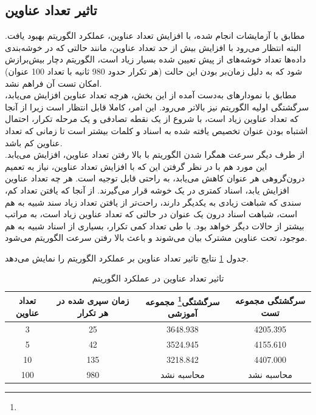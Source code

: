 \documentclass[11.5pt,a4paper]{article}
\newcommand{\enfootnote}[1]{\footnote{\lr{#1}}}
\begin{document}
\subsection{تاثیر تعداد عناوین}

مطابق با آزمایشات انجام شده، با افزایش تعداد عناوین، عملکرد الگوریتم بهبود یافت. البته انتظار می‌رود با افزایش بیش از حد تعداد عناوین، مانند حالتی که در خوشه‌بندی داده‌ها تعداد خوشه‌های از پیش تعیین شده بسیار زیاد است، الگوریتم دچار بیش‌برازش شود که به دلیل زمان‌بر بودن این حالت (هر تکرار حدود 980 ثانیه با تعداد 100 عنوان) امکان تست آن فراهم نشد.
\\
مطابق با نمودارهای به‌دست آمده از این بخش، هرچه تعداد عناوین افزایش می‌یابد، سرگشتگی اولیه الگوریتم نیز بالاتر می‌رود. این امر، کاملا قابل انتظار است زیرا از آنجا که تعداد عناوین زیاد است، با شروع از یک نقطه تصادفی و یک مرحله تکرار، احتمال اشتباه بودن عنوان تخصیص یافته شده به اسناد و کلمات بیشتر است تا زمانی که تعداد عناوین کم باشد.
\\
 از طرف دیگر سرعت همگرا شدن الگوریتم با بالا رفتن تعداد عناوین، افزایش می‌یابد. این مورد هم با در نظر گرفتن این که با افزایش تعداد عناوین، نیاز به تعمیم درون‌گروهی هر عنوان کاهش می‌یابد، به راحتی قابل توجیه است. هر چه تعداد عناوین افزایش یابد، اسناد کمتری در یک خوشه قرار می‌گیرند. از آنجا که یافتن تعداد کم، سندی که شباهت زیادی به یکدیگر دارند، راحت‌تر از یافتن تعداد زیاد سند شبیه به هم است، شباهت اسناد درون یک عنوان در حالتی که تعداد عناوین زیاد است، به مراتب بیشتر از حالات دیگر خواهد بود. با طی تعداد کمی تکرار، بسیاری از اسناد شبیه به هم موجود، تحت عناوین مشترک بیان می‌شوند و باعث بالا رفتن سرعت الگوریتم می‌شود.


جدول \ref{tbl:topics} نتایج تاثیر تعداد عناوین بر عملکرد الگوریتم را نمایش می‌دهد.

\begin{table}[h]
\center
\caption{تاثیر تعداد عناوین در عملکرد الگوریتم}
\label{tbl:topics}
\begin{tabular}{c | c | c | c}
تعداد عناوین & زمان سپری شده در هر تکرار & سرگشتگی\enfootnote{Perplexity} مجموعه آموزشی & سرگشتگی مجموعه تست\\
\hline
\hline
3 & 25 & 3648.938 & 4205.395 \\
5 & 42 & 3524.945 & 4155.610 \\
10 & 135 & 3218.842 & 4407.000 \\
100 & 980 & محاسبه نشد & محاسبه نشد \\
\end{tabular}
\end{table}
\end{document}
